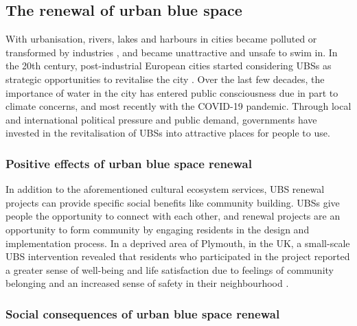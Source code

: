 \documentclass{article}
\begin{document}
\subsection{The renewal of urban blue space}

With urbanisation, rivers, lakes and harbours in cities became polluted or transformed by industries \parencite{kampa_langaas_anzaldua_2016}, and became unattractive and unsafe to swim in.
In the 20th century, post-industrial European cities started considering UBSs as strategic opportunities to revitalise the city \parencite{del2021dismantling}. Over the last few decades, the importance of water in the city has entered public consciousness due in part to climate concerns, and most recently with the COVID-19 pandemic.
Through local and international political pressure and public demand, governments have invested in the revitalisation of UBSs into attractive places for people to use. %

\subsubsection{Positive effects of urban blue space renewal}

In addition to the aforementioned cultural ecosystem services, UBS renewal projects can provide specific social benefits like community building.
UBSs give people the opportunity to connect with each other, and renewal projects are an opportunity to form community by engaging residents in the design and implementation process. In a deprived area of Plymouth, in the UK, a small-scale UBS intervention revealed that residents who participated in the project reported a greater sense of well-being and life satisfaction due to feelings of community belonging and an increased sense of safety in their neighbourhood \parencite{van2021urban}.


\subsubsection{Social consequences of urban blue space renewal}
\end{document}
